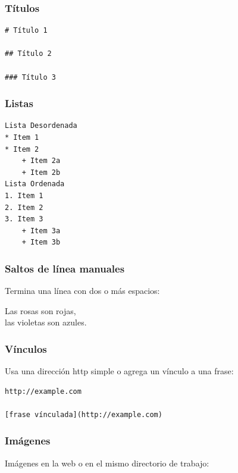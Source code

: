 \documentclass[]{book}
\theoremstyle{definition}
\theoremstyle{definition}
\theoremstyle{definition}
\theoremstyle{remark}
\begin{document}
\hypertarget{titulos}{%
\subsubsection{Títulos}\label{titulos}}

\begin{verbatim}
# Título 1

## Título 2

### Título 3
\end{verbatim}

\hypertarget{listas}{%
\subsubsection{Listas}\label{listas}}

\begin{verbatim}
Lista Desordenada
* Item 1
* Item 2
    + Item 2a
    + Item 2b
Lista Ordenada
1. Item 1
2. Item 2
3. Item 3
    + Item 3a
    + Item 3b
\end{verbatim}

\hypertarget{saltos-de-linea-manuales}{%
\subsubsection{Saltos de línea
manuales}\label{saltos-de-linea-manuales}}

Termina una línea con dos o más espacios:

Las rosas son rojas,\\
las violetas son azules.

\hypertarget{vinculos}{%
\subsubsection{Vínculos}\label{vinculos}}

Usa una dirección http simple o agrega un vínculo a una frase:

\begin{verbatim}
http://example.com

[frase vínculada](http://example.com)
\end{verbatim}

\hypertarget{imagenes}{%
\subsubsection{Imágenes}\label{imagenes}}

Imágenes en la web o en el mismo directorio de trabajo:
\end{document}
